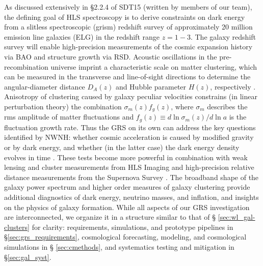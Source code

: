 
As discussed extensively in \S 2.2.4 of SDT15 (written by
members of our team), the defining goal of HLS spectroscopy is to derive
constraints on dark energy from a slitless spectroscopic (grism)
redshift survey of approximately 20 million emission line galaxies (ELG) in the redshift range $z=1-3$.
The galaxy redshift survey will enable high-precision measurements of the cosmic expansion history via BAO and structure growth via RSD.  
Acoustic oscillations in the pre-recombination universe imprint a characteristic scale on matter clustering, which
can be measured in the transverse and line-of-sight directions to
determine the angular-diameter distance $D_A(z)$ and Hubble parameter $H(z)$, respectively \cite{Blake03,Seo03,CW12}.  Anisotropy of clustering
caused by galaxy peculiar velocities constrains (in linear perturbation
theory) the combination $\sigma_m(z) f_g(z)$, where $\sigma_m$ describes
the rms amplitude of matter fluctuations and $f_g(z) \equiv d\ln\sigma_m(z)/d\ln a$ is the fluctuation growth rate.
Thus the GRS on its own can address the key questions identified by
NWNH: whether cosmic acceleration is caused by modified gravity
or by dark energy, and whether (in the latter case) the dark energy
density evolves in time \cite{Guzzo08,Wang08}.  These tests become more powerful in
combination with weak lensing and cluster measurements from HLS Imaging
and high-precision relative distance measurements from the Supernova
Survey \cite{dePutter:2013xda,dePutter:2013nha}. The broadband shape of the galaxy power spectrum and higher order
measures of galaxy clustering provide additional diagnostics of
dark energy, neutrino masses, and inflation, and insights on the physics of galaxy formation.  
While all aspects of our GRS investigation are interconnected, we
organize it in a structure similar to that of \S
\ref{sec:wl_gal-clusters} for clarity: requirements, simulations, and prototype pipelines in \S \ref{sec:grs_requirements},
cosmological forecasting, modeling, and cosmological simulations in \S
\ref{sec:cmethods}, and systematics testing and mitigation in \S \ref{sec:gal_syst}.

